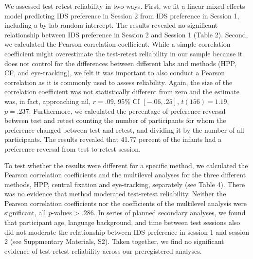 \documentclass[
  man,floatsintext]{apa6}
\begin{document}
We assessed test-retest reliability in two ways. First, we fit a linear mixed-effects model predicting IDS preference in Session 2 from IDS preference in Session 1, including a by-lab random intercept. The results revealed no significant relationship between IDS preference in Session 2 and Session 1 (Table 2). Second, we calculated the Pearson correlation coefficient. While a simple correlation coefficient might overestimate the test-retest reliability in our sample because it does not control for the differences between different labs and methods (HPP, CF, and eye-tracking), we felt it was important to also conduct a Pearson correlation as it is commonly used to assess reliability. Again, the size of the correlation coefficient was not statistically different from zero and the estimate was, in fact, approaching nil, \(r = .09\), 95\% CI \([-.06, .25]\), \(t(156) = 1.19\), \(p = .237\). Furthermore, we calculated the percentage of preference reversal between test and retest counting the number of participants for whom the preference changed between test and retest, and dividing it by the number of all participants. The results revealed that 41.77 percent of the infants had a preference reversal from test to retest session.

To test whether the results were different for a specific method, we calculated the Pearson correlation coefficients and the multilevel analyses for the three different methods, HPP, central fixation and eye-tracking, separately (see Table 4). There was no evidence that method moderated test-retest reliability. Neither the Pearson correlation coefficients nor the coefficients of the multilevel analysis were significant, all \emph{p}-values \textgreater{} .286. In series of planned secondary analyses, we found that participant age, language background, and time between test sessions also did not moderate the relationship between IDS preference in session 1 and session 2 (see Suppmentary Materials, S2). Taken together, we find no significant evidence of test-retest reliability across our preregistered analyses.
\end{document}
